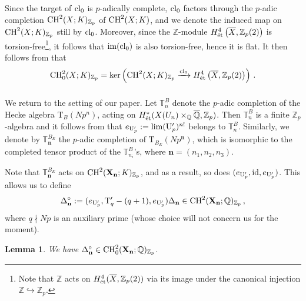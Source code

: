 \documentclass{amsart}
\numberwithin{equation}{section}
\newtheorem{lemma}[theorem]{Lemma}
\newcommand{\QQ}{\mathbb{Q}}
\newcommand{\ZZ}{\mathbb{Z}}
\newcommand{\TT}{\mathbb{T}}
\newcommand{\etale}{\textup{\'et}}
\begin{document}
Since the target of ${\rm cl}_0$ is $p$-adically complete, ${\rm cl}_0$ factors through the $p$-adic completion ${\rm CH}^2(X;K)_{\ZZ_p}$ of ${\rm CH}^2(X;K)$, and we denote the induced map on  ${\rm CH}^2(X;K)_{\ZZ_p}$ still by   ${\rm cl}_0$. Moreover, since  the $\ZZ$-module $H^4_{\etale} \left(\overline{X}, \ZZ_p(2)\right)$ is torsion-free\footnote{Note that $\ZZ$ acts on $H^4_{\etale} (\overline{X}, \ZZ_p(2))$ via its image under the canonical injection $\ZZ\hookrightarrow \ZZ_p$.}, it follows that ${\rm im}({\rm cl}_0)$ is also torsion-free, hence it is flat. It then follows from \cite[\href{https://stacks.math.columbia.edu/tag/0315}{Lemma 0315}]{stacks-project} that 
$${\rm CH}^2_0(X;K)_{\ZZ_p}=\ker \left( {\rm CH}^2(X;K)_{\ZZ_p} \xrightarrow{{\rm cl}_0} H^4_{\etale} \left(\overline{X}, \ZZ_p(2)\right)\right)\,.$$

\subsubsection{} We return to the setting of our paper. Let $\TT^{B}_{n}$ denote the $p$-adic completion of the Hecke algebra $\mathrm{T}_{B}(Np^n)$, acting on $H^\ast_{\textup{\'{e}t}}({X}(U_n)\times_{\QQ}\overline{\QQ},\ZZ_p)$. Then $\TT^{B}_{n}$ is a finite $\ZZ_p$-algebra and it follows from \cite[\S7.2, Lemma 1]{Hida_Elementary} that $e_{{\rm U}_p'}:=\lim ({\rm U}_p')^{n!}$ belongs to $\TT^{B}_{n}$. Similarly, we denote by $\TT^{B_E}_{\mathbf{n}}$ the $p$-adic completion of $\mathrm{T}_{B_E}(Np^{\mathbf{n}})$, which is isomorphic to the completed tensor product of the $\TT^{B}_{n_i}$'s, where $\mathbf{n}=(n_1,n_2,n_3)$.

Note that $\TT^{B_E}_{\mathbf{n}}$ acts on ${\rm CH}^2(\mathbf{X}_{\mathbf{n}};K)_{\ZZ_p}$, and as a result, so does $(e_{{\rm U}_p'},{\rm id},e_{{\rm U}_p'})$. This allows us to define
\begin{equation}
    \label{eqn_2023_11_08_1351_appendix}
    \Delta_{\mathbf{n}} ^{\circ}:=(e_{{\rm U}_p'},{\rm T}_{q}'-(q+1),e_{{\rm U}_p'}) \Delta_{\mathbf{n}}\in {\rm CH}^2(\mathbf{X}_{\mathbf{n}};\QQ)_{\ZZ_p}\,,
\end{equation}
where $q\nmid Np$ is an auxiliary prime (whose choice will not concern us for the moment). 




\begin{lemma}
    \label{DR_Lemma_2_5_appendix}
    We have $\Delta_{\mathbf{n}} ^{\circ}\in {\rm CH}^2_0(\mathbf{X}_{\mathbf{n}};\QQ)_{\ZZ_p}$. 
\end{lemma}
\end{document}
